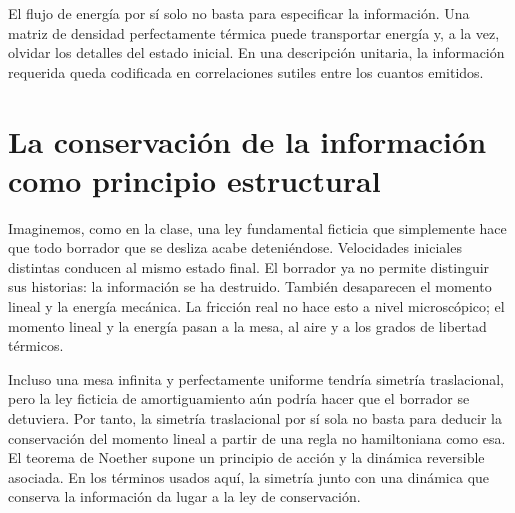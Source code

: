 \begin{classroomqa}
\end{classroomqa}

El flujo de energía por sí solo no basta para especificar la información. Una matriz de densidad perfectamente térmica puede transportar energía y, a la vez, olvidar los detalles del estado inicial. En una descripción unitaria, la información requerida queda codificada en correlaciones sutiles entre los cuantos emitidos.

\section{La conservación de la información como principio estructural}

\begin{classroomqa}
\end{classroomqa}

Imaginemos, como en la clase, una ley fundamental ficticia que simplemente hace que todo borrador que se desliza acabe deteniéndose. Velocidades iniciales distintas conducen al mismo estado final. El borrador ya no permite distinguir sus historias: la información se ha destruido. También desaparecen el momento lineal y la energía mecánica. La fricción real no hace esto a nivel microscópico; el momento lineal y la energía pasan a la mesa, al aire y a los grados de libertad térmicos.

Incluso una mesa infinita y perfectamente uniforme tendría simetría traslacional, pero la ley ficticia de amortiguamiento aún podría hacer que el borrador se detuviera. Por tanto, la simetría traslacional por sí sola no basta para deducir la conservación del momento lineal a partir de una regla no hamiltoniana como esa. El teorema de Noether supone un principio de acción y la dinámica reversible asociada. En los términos usados aquí, la simetría junto con una dinámica que conserva la información da lugar a la ley de conservación.

